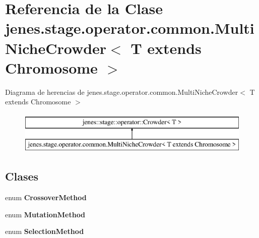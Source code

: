 \hypertarget{classjenes_1_1stage_1_1operator_1_1common_1_1_multi_niche_crowder_3_01_t_01extends_01_chromosome_01_4}{\section{Referencia de la Clase jenes.\-stage.\-operator.\-common.\-Multi\-Niche\-Crowder$<$ T extends Chromosome $>$}
\label{classjenes_1_1stage_1_1operator_1_1common_1_1_multi_niche_crowder_3_01_t_01extends_01_chromosome_01_4}
}
Diagrama de herencias de jenes.\-stage.\-operator.\-common.\-Multi\-Niche\-Crowder$<$ T extends Chromosome $>$\begin{figure}[H]
\begin{center}
\leavevmode
\includegraphics[height=2.000000cm]{classjenes_1_1stage_1_1operator_1_1common_1_1_multi_niche_crowder_3_01_t_01extends_01_chromosome_01_4}
\end{center}
\end{figure}
\subsection*{Clases}
\begin{DoxyCompactItemize}
\item 
enum {\bfseries Crossover\-Method}
\item 
enum {\bfseries Mutation\-Method}
\item 
enum {\bfseries Selection\-Method}
\end{DoxyCompactItemize}
